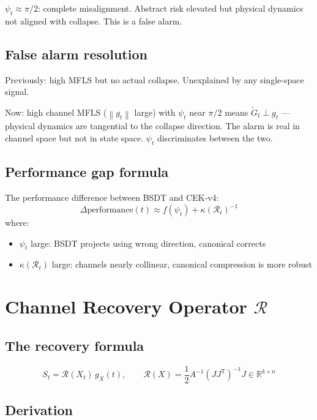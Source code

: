 \documentclass[11pt,a4paper]{article}
\theoremstyle{definition}
\newcommand{\R}{\mathbb{R}}
\newcommand{\T}{^{\mathsf{T}}}
\newcommand{\norm}[1]{\left\|#1\right\|}
\newcommand{\gX}{g_X}
\begin{document}
$\psi_t \approx \pi/2$: complete misalignment.
Abstract risk elevated but physical dynamics not aligned with collapse.
This is a false alarm.

\subsection{False alarm resolution}

Previously: high MFLS but no actual collapse. Unexplained by any single-space signal.

Now: high channel MFLS ($\norm{g_t}$ large) with $\psi_t$ near $\pi/2$
means $\tilde G_t \perp g_t$ — physical dynamics are tangential to the collapse direction.
The alarm is real in channel space but not in state space.
$\psi_t$ discriminates between the two.

\subsection{Performance gap formula}

The performance difference between BSDT and CEK-v4:
\[
\Delta\text{performance}(t) \approx f(\psi_t) + \kappa(\mathcal{R}_t)^{-1}
\]
where:
\begin{itemize}
\item $\psi_t$ large: BSDT projects using wrong direction, canonical corrects
\item $\kappa(\mathcal{R}_t)$ large: channels nearly collinear, canonical compression is more robust
\end{itemize}

\section{Channel Recovery Operator $\mathcal{R}$}

\subsection{The recovery formula}

\begin{lockedbox}
\[
S_t = \mathcal{R}(X_t)\,\gX(t), \qquad \mathcal{R}(X) = \frac{1}{2}A^{-1}(JJ\T)^{-1}J \in \R^{k\times n}
\]
\end{lockedbox}

\subsection{Derivation}
\end{document}
